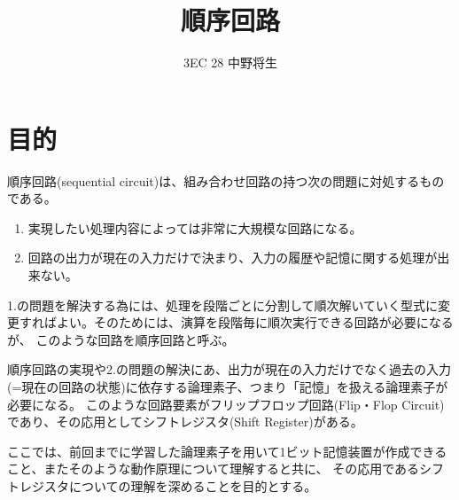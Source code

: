 \documentclass[dvipdfmx]{jsarticle}
\begin{document}
	\title{順序回路}
	\author{3EC 28 中野将生}
	\maketitle
	\section{目的}
		順序回路(sequential circuit)は、組み合わせ回路の持つ次の問題に対処するものである。
		\begin{enumerate}
			\item 実現したい処理内容によっては非常に大規模な回路になる。
			\item 回路の出力が現在の入力だけで決まり、入力の履歴や記憶に関する処理が出来ない。
		\end{enumerate}
		1.の問題を解決する為には、処理を段階ごとに分割して順次解いていく型式に変更すればよい。そのためには、演算を段階毎に順次実行できる回路が必要になるが、
		このような回路を順序回路と呼ぶ。 \par
		順序回路の実現や2.の問題の解決にあ、出力が現在の入力だけでなく過去の入力(=現在の回路の状態)に依存する論理素子、つまり「記憶」を扱える論理素子が必要になる。
		このような回路要素がフリップフロップ回路(Flip・Flop Circuit)であり、その応用としてシフトレジスタ(Shift Register)がある。\par
		ここでは、前回までに学習した論理素子を用いて1ビット記憶装置が作成できること、またそのような動作原理について理解すると共に、
		その応用であるシフトレジスタについての理解を深めることを目的とする。
\end{document}
